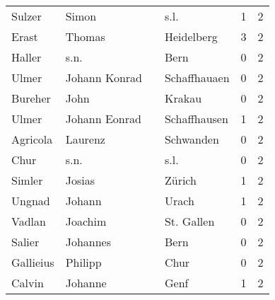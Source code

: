 \begin{center}
\begin{tiny}
\begin{longtabu}{llllrr}
                   Sulzer &                              Simon &             &                                        s.l. &          1 &         2 \\
                    Erast &                             Thomas &             &                                  Heidelberg &          3 &         2 \\
                   Haller &                               s.n. &             &                                        Bern &          0 &         2 \\
                    Ulmer &                      Johann Konrad &             &                                Schaffhauaen &          0 &         2 \\
                  Bureher &                               John &             &                                      Krakau &          0 &         2 \\
                    Ulmer &                      Johann Eonrad &             &                                Schaffhausen &          1 &         2 \\
                 Agricola &                            Laurenz &             &                                   Schwanden &          0 &         2 \\
                     Chur &                               s.n. &             &                                        s.l. &          0 &         2 \\
                   Simler &                             Josias &             &                                      Zürich &          1 &         2 \\
                   Ungnad &                             Johann &             &                                       Urach &          1 &         2 \\
                   Vadlan &                            Joachim &             &                                  St. Gallen &          0 &         2 \\
                   Salier &                           Johannes &             &                                        Bern &          0 &         2 \\
                Gallieius &                            Philipp &             &                                        Chur &          0 &         2 \\
                   Calvin &                            Johanne &             &                                        Genf &          1 &         2 \\

\end{longtabu}
\end{tiny}
\end{center}
